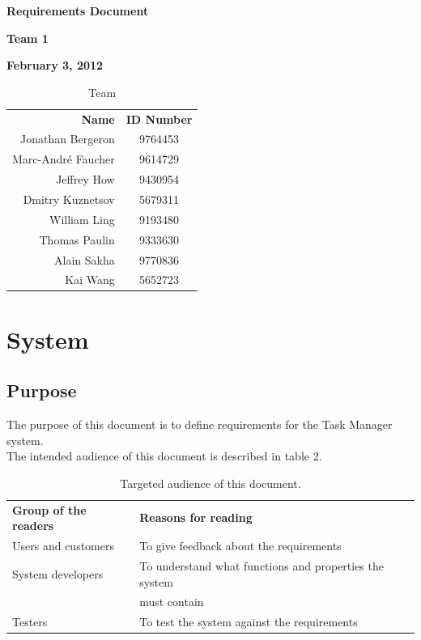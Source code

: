 \documentclass[12pt]{article}
\newcommand{\systemName}{Task Manager }
\begin{document}
\vspace*{0.5in}
\centerline{\bf\Large Requirements Document}

\vspace*{0.5in}
\centerline{\bf\Large Team 1}

\vspace*{0.5in}
\centerline{\bf\Large February 3, 2012}

\vspace*{1.5in}
\begin{table}[htbp]
\caption{Team}
\begin{center}
\begin{tabular}{|r | c|}
\hline
{\bf Name} & {\bf ID Number} \\
Jonathan Bergeron & 9764453 \\
Marc-Andr\'{e} Faucher & 9614729 \\
Jeffrey How & 9430954 \\
Dmitry Kuznetsov & 5679311 \\
William Ling & 9193480 \\
Thomas Paulin & 9333630 \\
Alain Sakha & 9770836 \\
Kai Wang & 5652723 \\
\hline
\end{tabular}
\end{center}
\end{table}

\clearpage

\section{System}

\subsection{Purpose}

The purpose of this document is to define requirements for the \systemName system. \\

The intended audience of this document is described in table 2. \\

\begin{table}[htbp]
\caption{Targeted audience of this document.}
\begin{center}
\begin{tabular}{|l | l|}
\hline
{\bf Group of the readers} & {\bf Reasons for reading}\\ \cline{1-2}
Users and customers & To give feedback about the requirements\\ \cline{1-2}
System developers & To understand what functions and properties the system \\&must contain\\ \cline{1-2}
Testers & To test the system against the requirements\\ \cline{1-2}
\hline
\end{tabular}
\end{center}
\end{table}
\end{document}
